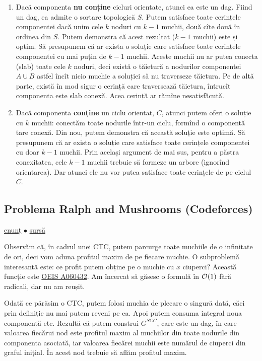 \documentclass[../main.tex]{subfiles}
\begin{document}
\begin{enumerate}
  \item Dacă componenta \textbf{nu conține} cicluri orientate, atunci ea este un dag. Fiind un dag, ea admite o sortare topologică $S$. Putem satisface toate cerințele componentei dacă unim cele $k$ noduri cu $k - 1$ muchii, două cîte două în ordinea din $S$. Putem demonstra că acest rezultat ($k-1$ muchii) este și optim. Să presupunem că ar exista o soluție care satisface toate cerințele componentei cu mai puțin de $k-1$ muchii. Aceste muchii nu ar putea conecta (slab) toate cele $k$ noduri, deci există o tăietură a nodurilor componentei $A \cup B$ astfel încît nicio muchie a soluției să nu traverseze tăietura. Pe de altă parte, există în mod sigur o cerință care traversează tăietura, întrucît componenta este slab conexă. Acea cerință ar rămîne nesatisfăcută.

  \item Dacă componenta \textbf{conține} un ciclu orientat, $C$, atunci putem oferi o soluție cu $k$ muchii: conectăm toate nodurile într-un ciclu, formînd o componentă tare conexă. Din nou, putem demonstra că această soluție este optimă. Să presupunem că ar exista o soluție care satisface toate cerințele componentei cu doar $k-1$ muchii. Prin același argument de mai sus, pentru a păstra conexitatea, cele $k-1$ muchii trebuie să formeze un arbore (ignorînd orientarea). Dar atunci ele nu vor putea satisface toate cerințele de pe ciclul $C$.
\end{enumerate}

\subsection{Problema Ralph and Mushrooms (Codeforces)}
\label{problem:ralph-and-mushrooms}

\href{https://codeforces.com/contest/894/problem/E}{enunț}
$\bullet$
\hyperref[code:ralph-and-mushrooms]{sursă}

Observăm că, în cadrul unei CTC, putem parcurge toate muchiile de o infinitate de ori, deci vom aduna profitul maxim de pe fiecare muchie. O subproblemă interesantă este: ce profit putem obține pe o muchie cu $x$ ciuperci? Această funcție este \href{https://oeis.org/A060432}{OEIS A060432}. Am încercat să găsesc o formulă în $\mathcal{O}(1)$ fără radicali, dar nu am reușit.

Odată ce părăsim o CTC, putem folosi muchia de plecare o singură dată, căci prin definiție nu mai putem reveni pe ea. Apoi putem consuma integral noua componentă etc. Rezultă că putem construi $G^{SCC}$, care este un dag, în care valoarea fiecărui nod este profitul maxim al muchiilor din toate nodurile din componenta asociată, iar valoarea fiecărei muchii este numărul de ciuperci din graful inițial. În acest nod trebuie să aflăm profitul maxim.
\end{document}

